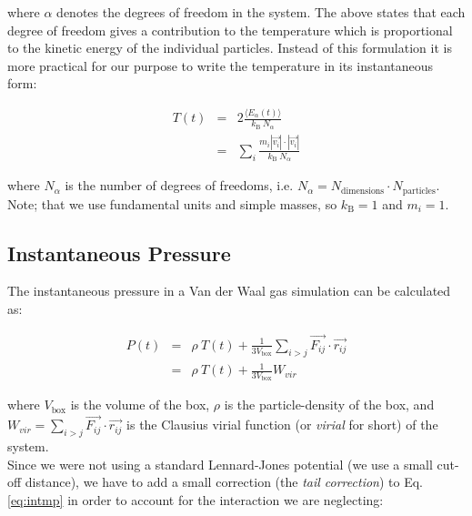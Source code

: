\documentclass{article}
\begin{document}
where $\alpha$ denotes the degrees of freedom in the system.
The above states that each degree of freedom gives a contribution to the temperature which is proportional to the kinetic energy of the individual particles.
Instead of this formulation it is more practical for our purpose to write the temperature in its instantaneous form:

\begin{eqnarray}
    T(t) &=& 2 \frac{\langle E_{\alpha}(t) \rangle}{k_\mathrm{B} \ N_\alpha }\\
         &=& \sum_i \frac{m_i|\vec{v_i}| \cdot |\vec{v_i}|}{k_\mathrm{B} \ N_\alpha}
\end{eqnarray}

where $N_\alpha$ is the number of degrees of freedoms, i.e. $N_\alpha = N_{\mathrm{dimensions}} \cdot N_{\mathrm{particles}}$. Note; that we use fundamental units and simple masses, so $k_\mathrm{B} = 1$ and $m_i = 1$.\\

% 


\subsection{Instantaneous Pressure}

The instantaneous pressure in a Van der Waal gas simulation can be calculated as:

\begin{eqnarray}
    P(t) & = & \rho \ T(t) + \frac{1}{3V_\mathrm{box}}  \sum_{i>j} \vec{F_{ij}} \cdot \vec{r_{ij}}\\
         & = & \rho \ T(t) + \frac{1}{3V_\mathrm{box}} W_{vir} \label{eq:intmp}
\end{eqnarray}

where $V_\mathrm{box}$ is the volume of the box,
$\rho$ is the particle-density of the box, and
$W_{vir} = \sum_{i>j} \vec{F_{ij}} \cdot \vec{r_{ij}}$ is the Clausius virial function (or \textit{virial} for short) of the system.\\

Since we were not using a standard Lennard-Jones potential (we use a small cut-off distance),
we have to add a small correction (the \textit{tail correction}) to Eq. \ref{eq:intmp} in order to account for the interaction we are neglecting:
\end{document}
